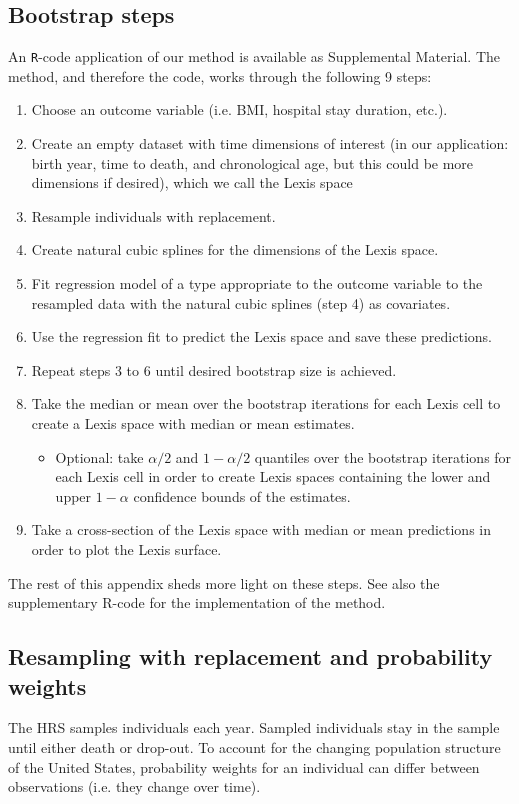 \documentclass[12pt,oneside,a4paper]{article} %
\begin{document}
\begin{appendices}
\subsection{Bootstrap steps}
An \texttt{R}-code application of our method is available as Supplemental Material. The method, and therefore the code, works through the following 9 steps:
\begin{enumerate}
\item{Choose an outcome variable (i.e. BMI, hospital stay duration, etc.).}
\item{Create an empty dataset with time dimensions of interest (in our application: birth year, time to death, and chronological age, but this could be more dimensions if desired), which we call the Lexis space}
\item{Resample individuals with replacement.}
\item{Create natural cubic splines for the dimensions of the Lexis space.}
\item{Fit regression model of a type appropriate to the outcome variable to the resampled data with the natural cubic splines (step 4) as covariates.}
\item{Use the regression fit to predict the Lexis space and save these predictions.}
\item{Repeat steps 3 to 6 until desired bootstrap size is achieved.}
\item{Take the median or mean over the bootstrap iterations for each Lexis cell to create a Lexis space with median or mean estimates.\begin{itemize}\item{Optional: take $\alpha/2$ and  $1-\alpha/2$ quantiles over the bootstrap iterations for each Lexis cell in order to create Lexis spaces containing the lower and upper $1-\alpha$ confidence bounds of the estimates.}\end{itemize}}
\item{Take a cross-section of the Lexis space with median or mean predictions in order to plot the Lexis surface.}
\end{enumerate}

The rest of this appendix sheds more light on these steps. See also the supplementary R-code for the implementation of the method.

\subsection{Resampling with replacement and probability weights}
The HRS samples individuals each year. Sampled individuals stay in the sample until either death or drop-out. To account for the changing population structure of the United States, probability weights for an individual can differ between observations (i.e. they change over time).


\end{appendices}
\end{document}
